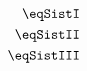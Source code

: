 \begin{equation} \label{eq:ExMultiOneN}
	\begin{aligned}
		\eqSistI \\
		\eqSistII \\
		\eqSistIII
	\end{aligned}
\end{equation}